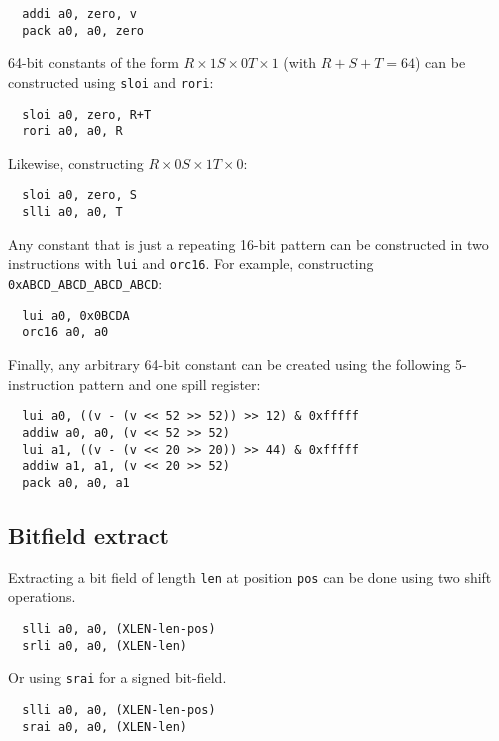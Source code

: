 \begin{verbatim}
  addi a0, zero, v
  pack a0, a0, zero
\end{verbatim}

64-bit constants of the form $R\times1 S\times0 T\times1$ (with $R+S+T=64$)
can be constructed using {\tt sloi} and {\tt rori}:

\begin{verbatim}
  sloi a0, zero, R+T
  rori a0, a0, R
\end{verbatim}

Likewise, constructing $R\times0 S\times1 T\times0$:

\begin{verbatim}
  sloi a0, zero, S
  slli a0, a0, T
\end{verbatim}

Any constant that is just a repeating 16-bit pattern can be constructed
in two instructions with {\tt lui} and {\tt orc16}. For example,
constructing {\tt 0xABCD\_ABCD\_ABCD\_ABCD}:

\begin{verbatim}
  lui a0, 0x0BCDA
  orc16 a0, a0
\end{verbatim}

Finally, any arbitrary 64-bit constant can be created using the following
5-instruction pattern and one spill register:

\begin{verbatim}
  lui a0, ((v - (v << 52 >> 52)) >> 12) & 0xfffff
  addiw a0, a0, (v << 52 >> 52)
  lui a1, ((v - (v << 20 >> 20)) >> 44) & 0xfffff
  addiw a1, a1, (v << 20 >> 52)
  pack a0, a0, a1
\end{verbatim}


\subsection{Bitfield extract}

Extracting a bit field of length {\tt len} at position {\tt pos} can be done using
two shift operations.

\begin{verbatim}
  slli a0, a0, (XLEN-len-pos)
  srli a0, a0, (XLEN-len)
\end{verbatim}

Or using {\tt srai} for a signed bit-field.

\begin{verbatim}
  slli a0, a0, (XLEN-len-pos)
  srai a0, a0, (XLEN-len)
\end{verbatim}

